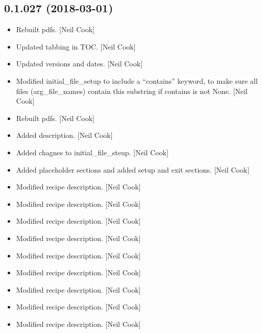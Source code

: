 \documentclass[a4paper,10pt,english]{report}
\begin{document}
\subsection{0.1.027 (2018-03-01)}
\label{\detokenize{misc/changelog:id475}}\begin{itemize}
\item {} 
Rebuilt pdfs. {[}Neil Cook{]}

\item {} 
Updated tabbing in TOC. {[}Neil Cook{]}

\item {} 
Updated versions and dates. {[}Neil Cook{]}

\item {} 
Modified initial\_file\_setup to include a “contains” keyword, to make
sure all files (arg\_file\_names) contain this substring if contains is
not None. {[}Neil Cook{]}

\item {} 
Rebuilt pdfs. {[}Neil Cook{]}

\item {} 
Added description. {[}Neil Cook{]}

\item {} 
Added chagnes to initial\_file\_steup. {[}Neil Cook{]}

\item {} 
Added placeholder sections and added setup and exit sections. {[}Neil
Cook{]}

\item {} 
Modified recipe description. {[}Neil Cook{]}

\item {} 
Modified recipe description. {[}Neil Cook{]}

\item {} 
Modified recipe description. {[}Neil Cook{]}

\item {} 
Modified recipe description. {[}Neil Cook{]}

\item {} 
Modified recipe description. {[}Neil Cook{]}

\item {} 
Modified recipe description. {[}Neil Cook{]}

\item {} 
Modified recipe description. {[}Neil Cook{]}

\item {} 
Modified recipe description. {[}Neil Cook{]}

\item {} 
Modified recipe description. {[}Neil Cook{]}


\end{itemize}
\end{document}
